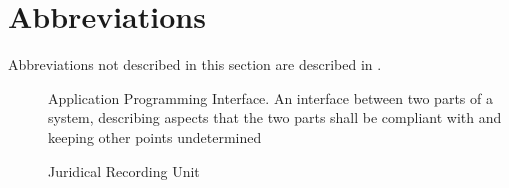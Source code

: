 \section{Abbreviations}

Abbreviations not described in this section are described in
\cite{subset-023}.

\begin{description}
\item[] Application Programming Interface. An interface
  between two parts of a system, describing aspects that the two parts
  shall be compliant with and keeping other points undetermined
\item [] 
\item [] Juridical Recording Unit
\end{description}


